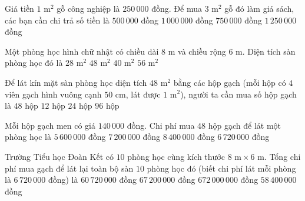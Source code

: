 \begin{ex} %
Giá tiền $1\text{ m}^2$ gỗ công nghiệp là $250\,000$ đồng. Để mua $3\text{ m}^2$ gỗ đó làm giá sách, các bạn cần chi trả số tiền là
\choice
{$500\,000$ đồng}
{$1\,000\,000$ đồng}
{\True $750\,000$ đồng}
{$1\,250\,000$ đồng}
\end{ex}

\begin{ex} %
Một phòng học hình chữ nhật có chiều dài $8\text{ m}$ và chiều rộng $6\text{ m}$. Diện tích sàn phòng học đó là
\choice
{$28\text{ m}^2$}
{\True $48\text{ m}^2$}
{$40\text{ m}^2$}
{$56\text{ m}^2$}
\end{ex}

\begin{ex} %
Để lát kín mặt sàn phòng học diện tích $48\text{ m}^2$ bằng các hộp gạch (mỗi hộp có $4$ viên gạch hình vuông cạnh $50\text{ cm}$, lát được $1\text{ m}^2$), người ta cần mua số hộp gạch là
\choice
{\True $48$ hộp}
{$12$ hộp}
{$24$ hộp}
{$96$ hộp}
\end{ex}

\begin{ex} %
Mỗi hộp gạch men có giá $140\,000$ đồng. Chi phí mua $48$ hộp gạch để lát một phòng học là
\choice
{$5\,600\,000$ đồng}
{$7\,200\,000$ đồng}
{$8\,400\,000$ đồng}
{\True $6\,720\,000$ đồng}
\end{ex}

\begin{ex} %
Trường Tiểu học Đoàn Kết có $10$ phòng học cùng kích thước $8\text{ m} \times 6\text{ m}$. Tổng chi phí mua gạch để lát lại toàn bộ sàn $10$ phòng học đó (biết chi phí lát mỗi phòng là $6\,720\,000$ đồng) là
\choice
{$60\,720\,000$ đồng}
{\True $67\,200\,000$ đồng}
{$672\,000\,000$ đồng}
{$58\,400\,000$ đồng}
\end{ex}

